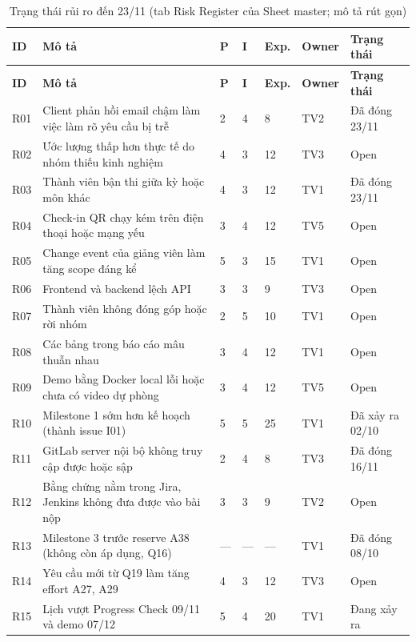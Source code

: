 \begingroup\tblsetup\tblzebra
\begin{longtable}{L{0.9cm}L{6.4cm}L{0.6cm}L{0.6cm}L{1.0cm}L{1.4cm}L{3.0cm}}
\caption{Trạng thái rủi ro đến 23/11 (tab Risk Register của Sheet master; mô tả rút gọn)}\label{tab:risk-status}\\
\toprule
{}\textbf{ID} & \textbf{Mô tả} & \textbf{P} & \textbf{I} & \textbf{Exp.} & \textbf{Owner} & \textbf{Trạng thái} \\
\midrule
\endfirsthead
\toprule
{}\textbf{ID} & \textbf{Mô tả} & \textbf{P} & \textbf{I} & \textbf{Exp.} & \textbf{Owner} & \textbf{Trạng thái} \\
\midrule
\endhead
\bottomrule
\endlastfoot
R01 & Client phản hồi email chậm làm việc làm rõ yêu cầu bị trễ & 2 & 4 & 8 & TV2 & Đã đóng 23/11 \\
R02 & Ước lượng thấp hơn thực tế do nhóm thiếu kinh nghiệm & 4 & 3 & 12 & TV3 & Open \\
R03 & Thành viên bận thi giữa kỳ hoặc môn khác & 4 & 3 & 12 & TV1 & Đã đóng 23/11 \\
R04 & Check-in QR chạy kém trên điện thoại hoặc mạng yếu & 3 & 4 & 12 & TV5 & Open \\
R05 & Change event của giảng viên làm tăng scope đáng kể & 5 & 3 & 15 & TV1 & Open \\
R06 & Frontend và backend lệch API & 3 & 3 & 9 & TV3 & Open \\
R07 & Thành viên không đóng góp hoặc rời nhóm & 2 & 5 & 10 & TV1 & Open \\
R08 & Các bảng trong báo cáo mâu thuẫn nhau & 3 & 4 & 12 & TV1 & Open \\
R09 & Demo bằng Docker local lỗi hoặc chưa có video dự phòng & 3 & 4 & 12 & TV5 & Open \\
R10 & Milestone 1 sớm hơn kế hoạch (thành issue I01) & 5 & 5 & 25 & TV1 & Đã xảy ra 02/10 \\
R11 & GitLab server nội bộ không truy cập được hoặc sập & 2 & 4 & 8 & TV3 & Đã đóng 16/11 \\
R12 & Bằng chứng nằm trong Jira, Jenkins không đưa được vào bài nộp & 3 & 3 & 9 & TV2 & Open \\
R13 & Milestone 3 trước reserve A38 (không còn áp dụng, Q16) & --- & --- & --- & TV1 & Đã đóng 08/10 \\
R14 & Yêu cầu mới từ Q19 làm tăng effort A27, A29 & 4 & 3 & 12 & TV3 & Open \\
R15 & Lịch vượt Progress Check 09/11 và demo 07/12 & 5 & 4 & 20 & TV1 & Đang xảy ra \\

\end{longtable}
